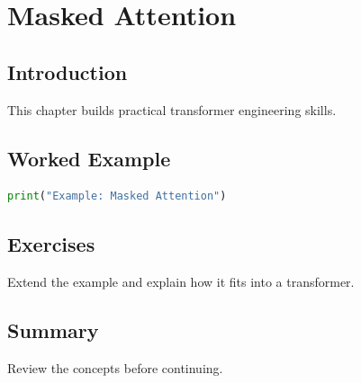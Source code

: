 \chapter{Masked Attention}
\label{chap:vol8-17}



\section{Introduction}
This chapter builds practical transformer engineering skills.

\section{Worked Example}
\begin{lstlisting}[language=Python]
print("Example: Masked Attention")
\end{lstlisting}

\section{Exercises}
\begin{exercise}
Extend the example and explain how it fits into a transformer.
\end{exercise}

\section{Summary}
Review the concepts before continuing.
